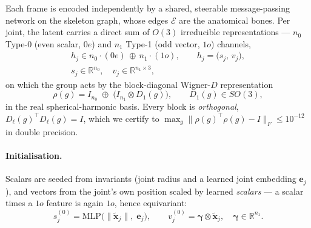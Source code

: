 \documentclass[10pt,journal]{IEEEtran}
\begin{document}
Each frame is encoded independently by a shared, steerable message-passing network on the skeleton
graph, whose edges $\mathcal{E}$ are the anatomical bones. Per joint, the latent carries a direct sum
of $O(3)$ irreducible representations --- $n_0$ Type-0 (even scalar, $0e$) and $n_1$ Type-1 (odd
vector, $1o$) channels,
%
\begin{equation}
\label{eq:irreps}
\begin{gathered}
h_j \in n_0\!\cdot\!(0e)\,\oplus\, n_1\!\cdot\!(1o),
\qquad h_j=\big(s_j,\,v_j\big),\\[2pt]
s_j\in\mathbb{R}^{n_0},\quad v_j\in\mathbb{R}^{n_1\times3},
\end{gathered}
\end{equation}
%
on which the group acts by the block-diagonal Wigner-$D$ representation
%
\begin{equation}
\label{eq:rho}
\rho(g)=I_{n_0}\;\oplus\;\big(I_{n_1}\otimes D_1(g)\big),\qquad D_1(g)\in SO(3),
\end{equation}
%
in the real spherical-harmonic basis. Every block is \emph{orthogonal},
$D_{\ell}(g)^{\!\top}D_{\ell}(g)=I$, which we certify to
$\max_g\|\rho(g)^{\!\top}\rho(g)-I\|_F\le10^{-12}$ in double precision.

\paragraph{Initialisation.} Scalars are seeded from invariants (joint radius and a learned joint
embedding $\bm{e}_j$), and vectors from the joint's own position scaled by learned \emph{scalars}
--- a scalar times a $1o$ feature is again $1o$, hence equivariant:
%
\begin{equation}
\label{eq:init}
s_j^{(0)}=\mathrm{MLP}\big(\|\tilde{\bm{x}}_j\|,\;\bm{e}_j\big),
\qquad
v_j^{(0)}=\bm{\gamma}\otimes\tilde{\bm{x}}_j,\quad \bm{\gamma}\in\mathbb{R}^{n_1}.
\end{equation}
\end{document}
